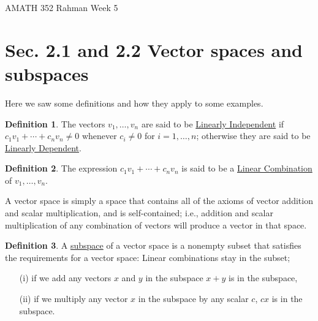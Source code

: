 \documentclass[reqno]{amsart}
\theoremstyle{definition}
\newtheorem{definition}{Definition}
\begin{document}
\begin{flushleft}
{\sc \Large AMATH 352 Rahman} \hfill Week 5
\bigskip
\end{flushleft}

\newcommand{\R}{\mathbb{R}}
\newcommand{\N}{\mathbb{N}}
\newcommand{\Z}{\mathbb{Z}}
\newcommand{\Q}{\mathbb{Q}}
\renewcommand{\CancelColor}{\color{red}}
\newcommand{\?}{\stackrel{?}{=}}
\renewcommand{\varphi}{\phi}
\newcommand{\card}{\text{Card}}
\newcommand{\bigzero}{\text{\Huge 0}}
\newcommand{\curvearrowdown}{{\color{red}\rotatebox{90}{$\curvearrowleft$}}}
\newcommand{\curvearrowup}{{\color{red}\rotatebox{90}{$\curvearrowright$}}}



\section*{Sec. 2.1 and 2.2 Vector spaces and subspaces}

Here we saw some definitions and how they apply to some examples.

\begin{definition}
The vectors $v_1,\ldots,v_n$ are said to be \underline{Linearly Independent} if
$c_1v_1 + \cdots + c_nv_n \neq 0$ whenever $c_i \neq 0$ for $i = 1,\ldots,n$; otherwise
they are said to be \underline{Linearly Dependent}.
\end{definition}

\begin{definition}
The expression $c_1v_1 + \cdots + c_nv_n$ is said to be a \underline{Linear Combination} of $v_1,\ldots,v_n$.
\end{definition}

A vector space is simply a space that contains all of the axioms of vector addition and scalar multiplication, and
is self-contained; i.e., addition and scalar multiplication of any combination of vectors will produce a vector
in that space.

\begin{definition}
A \underline{subspace} of a vector space is a nonempty subset that satisfies the requirements for a vector space:
Linear combinations stay in the subset;
%
\begin{itemize}

\item[(i)  ]  if we add any vectors $x$ and $y$ in the subspace $x+y$ is in the subspace,

\item[(ii)]  if we multiply any vector $x$ in the subspace by any scalar $c$, $cx$ is in the subspace.

\end{itemize}
\label{Def: Subspace}
\end{definition}
\end{document}
